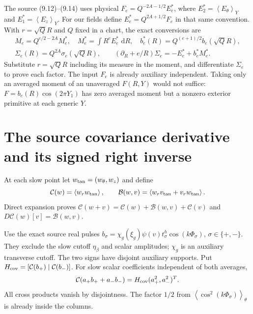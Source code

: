 \documentclass[11pt]{article}
\newcommand{\dd}{\,\mathrm d}
\newcommand{\av}[1]{\left\langle #1\right\rangle}
\newcommand{\Cov}{\mathcal C}
\newcommand{\Cross}{\mathcal B}
\begin{document}
The source (9.12)--(9.14) uses physical
$F_e=Q^{-2A-1/2}E_e^*$, where
$E_2^*=\av{E_\theta}_Y$ and $E_1^*=\av{E_z}_Y$.
For our fields define $E_e^*=Q^{2A+1/2}F_e$ in that same convention.
With $r=\sqrt Q R$ and $Q$ fixed in a chart, the exact conversions are
\begin{gather}
 M_e=Q^{e/2-2A}M_e^*,\quad M_e^*=\int R^eE_e^*\,\dd R,\quad
 b_e^*(R)=Q^{(e+1)/2}b_e(\sqrt Q R),\nonumber\\
 \Sigma_e(R)=Q^{2A}\sigma_e(\sqrt Q R),\qquad
 (\partial_R+e/R)\Sigma_e=-E_e^*+b_e^*M_e^*. \label{nsbridge:cb:chart}
\end{gather}
Substitute $r=\sqrt Q R$ including its measure in the moment, and
differentiate $\Sigma_e$ to prove each factor. The input $F_e$ is already
auxiliary independent. Taking only an averaged moment of an unaveraged
$F(R,Y)$ would not suffice: $F=b_e(R)\cos(2\pi Y_1)$ has zero averaged
moment but a nonzero exterior primitive at each generic $Y$.

\section{The source covariance derivative and its signed right inverse}
At each slow point let $w_{\rm tan}=(w_\theta,w_z)$ and define
\[
 \Cov(w)=\av{w_rw_{\rm tan}},\qquad
 \Cross(w,v)=\av{w_rv_{\rm tan}+v_rw_{\rm tan}}.
\]
Direct expansion proves
$\Cov(w+v)=\Cov(w)+\Cross(w,v)+\Cov(v)$ and
$D\Cov(w)[v]=\Cross(w,v)$.

Use the exact source real pulses
$b_\sigma=\chi_g(\xi_g)\psi(v)t_\sigma^h\cos(k\Phi_\sigma)$,
$\sigma\in\{+,-\}$. They exclude the slow cutoff $\eta_\beta$ and
scalar amplitudes; $\chi_g$ is an auxiliary transverse cutoff.
The two signs have disjoint auxiliary supports. Put
$H_{\rm cov}=[\Cov(b_+)\mid\Cov(b_-)]$.
For slow scalar coefficients independent of both averages,
\[
 \Cov(a_+b_++a_-b_-)=H_{\rm cov}(a_+^2,a_-^2)^T.
\]
All cross products vanish by disjointness. The factor $1/2$ from
$\av{\cos^2(k\Phi_\sigma)}_\theta$ is already inside the columns.
\end{document}
